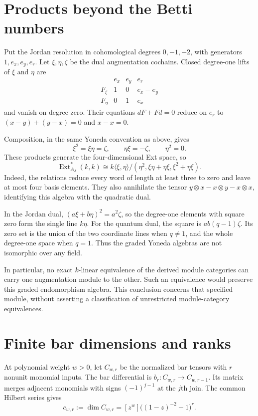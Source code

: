 \section{Products beyond the Betti numbers}

Put the Jordan resolution in cohomological degrees $0,-1,-2$, with generators $1,e_x,e_y,e_r$.
Let $\xi,\eta,\zeta$ be the dual augmentation cochains.
Closed degree-one lifts of $\xi$ and $\eta$ are
\[
 \begin{array}{c|ccc}
       &e_x&e_y&e_r\\ \hline
 F_\xi&1&0&e_x-e_y\\
 F_\eta&0&1&e_x
 \end{array}
\]
and vanish on degree zero.
Their equations $dF+Fd=0$ reduce on $e_r$ to
$(x-y)+(y-x)=0$ and $x-x=0$.

Composition, in the same Yoneda convention as above, gives
\[
 \xi^2=\xi\eta=\zeta,\qquad
 \eta\xi=-\zeta,\qquad \eta^2=0.
\]
These products generate the four-dimensional Ext space, so
\[
 \operatorname{Ext}_{A_J}^*(k,k)
 \cong k\langle\xi,\eta\rangle/
       (\eta^2,\xi\eta+\eta\xi,\xi^2+\eta\xi).
\]
Indeed, the relations reduce every word of length at least three to zero and leave at most four basis elements.
They also annihilate the tensor $y\otimes x-x\otimes y-x\otimes x$, identifying this algebra with the quadratic dual.

In the Jordan dual, $(a\xi+b\eta)^2=a^2\zeta$, so the degree-one elements with square zero form the single line $k\eta$.
For the quantum dual, the square is $ab(q-1)\zeta$.
Its zero set is the union of the two coordinate lines when $q\ne1$, and the whole degree-one space when $q=1$.
Thus the graded Yoneda algebras are not isomorphic over any field.

In particular, no exact $k$-linear equivalence of the derived module categories can carry one augmentation module to the other.
Such an equivalence would preserve this graded endomorphism algebra.
This conclusion concerns that specified module, without asserting a classification of unrestricted module-category equivalences.

\section{Finite bar dimensions and ranks}

At polynomial weight $w>0$, let $C_{w,r}$ be the normalized bar tensors with $r$ nonunit monomial inputs.
The bar differential is $b_r:C_{w,r}\to C_{w,r-1}$.
Its matrix merges adjacent monomials with signs $(-1)^{j-1}$ at the $j$th join.
The common Hilbert series gives
\[
 c_{w,r}:=\dim C_{w,r}
 =[z^w]\bigl((1-z)^{-2}-1\bigr)^r.
\]


